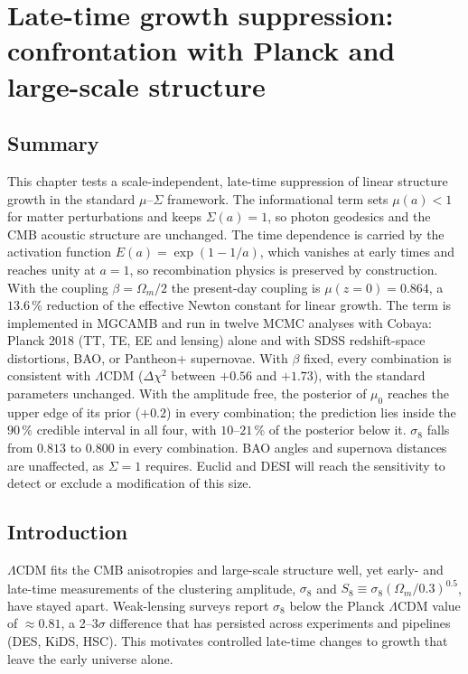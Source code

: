 
\chapter{Late-time growth suppression: confrontation with Planck and large-scale structure}\label{ch:latetime}

\section*{Summary}
This chapter tests a scale-independent, late-time suppression of linear structure growth in the standard $\mu$--$\Sigma$ framework. The informational term sets
$\mu(a)<1$ for matter perturbations and keeps $\Sigma(a)=1$, so photon geodesics and the CMB acoustic structure are unchanged. The time dependence is
carried by the activation function $E(a)=\exp(1-1/a)$, which vanishes at early times and reaches unity at $a=1$, so recombination physics is preserved by
construction. With the coupling $\beta=\Omega_m/2$ the present-day coupling is $\mu(z{=}0)=0.864$, a $13.6\,\%$ reduction of the effective Newton constant
for linear growth. The term is implemented in MGCAMB and run in twelve MCMC analyses with Cobaya: Planck 2018 (TT, TE, EE and lensing) alone and with SDSS
redshift-space distortions, BAO, or Pantheon+ supernovae. With $\beta$ fixed, every combination is consistent with $\Lambda$CDM ($\Delta\chi^2$ between
$+0.56$ and $+1.73$), with the standard parameters unchanged. With the amplitude free, the posterior of $\mu_0$ reaches the upper edge of its prior ($+0.2$) in every combination; the prediction lies inside the
$90\,\%$ credible interval in all four, with $10$--$21\,\%$ of the posterior below it. $\sigma_8$ falls from $0.813$ to $0.800$ in every combination. BAO angles and supernova distances are unaffected,
as $\Sigma=1$ requires. Euclid and DESI will reach the sensitivity to detect or exclude a modification of this size.

\section{Introduction}
$\Lambda$CDM fits the CMB anisotropies and large-scale structure well, yet early- and late-time measurements of the clustering amplitude, $\sigma_8$ and
$S_8\equiv\sigma_8(\Omega_m/0.3)^{0.5}$, have stayed apart. Weak-lensing surveys report $\sigma_8$ below the Planck $\Lambda$CDM value of $\approx0.81$, a
2--3$\sigma$ difference that has persisted across experiments and pipelines (DES, KiDS, HSC). This motivates controlled late-time changes to growth that
leave the early universe alone.

